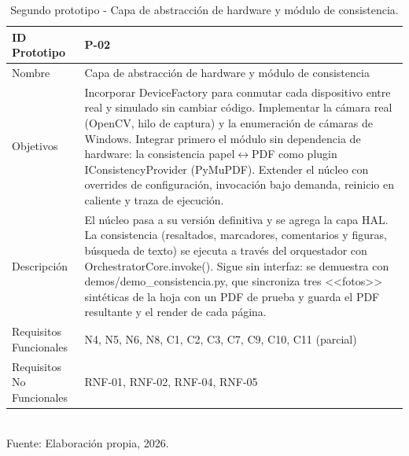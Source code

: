 \begin{table}[h!]
\centering
\caption{Segundo prototipo - Capa de abstracción de hardware y módulo de consistencia.}
\label{tab:prototipo-p02}
\begin{tabularx}{\textwidth}{|l|X|}
\hline
ID Prototipo & P-02 \\ \hline
Nombre & Capa de abstracción de hardware y módulo de consistencia \\ \hline
Objetivos & Incorporar DeviceFactory para conmutar cada dispositivo entre real y simulado sin cambiar código. \newline Implementar la cámara real (OpenCV, hilo de captura) y la enumeración de cámaras de Windows. \newline Integrar primero el módulo sin dependencia de hardware: la consistencia papel$\leftrightarrow$PDF como plugin IConsistencyProvider (PyMuPDF). \newline Extender el núcleo con overrides de configuración, invocación bajo demanda, reinicio en caliente y traza de ejecución. \\ \hline
Descripción & El núcleo pasa a su versión definitiva y se agrega la capa HAL. La consistencia (resaltados, marcadores, comentarios y figuras, búsqueda de texto) se ejecuta a través del orquestador con OrchestratorCore.invoke(). Sigue sin interfaz: se demuestra con demos/demo\_consistencia.py, que sincroniza tres <<fotos>> sintéticas de la hoja con un PDF de prueba y guarda el PDF resultante y el render de cada página. \\ \hline
Requisitos Funcionales & N4, N5, N6, N8, C1, C2, C3, C7, C9, C10, C11 (parcial) \\ \hline
Requisitos No Funcionales & RNF-01, RNF-02, RNF-04, RNF-05 \\ \hline
\end{tabularx}
\\[2pt] {\small Fuente: Elaboración propia, 2026.}
\end{table}

